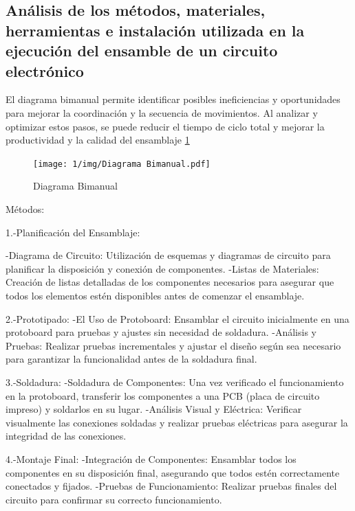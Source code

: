     \subsection{Análisis de los métodos, materiales, herramientas e instalación utilizada en la ejecución del ensamble de un circuito electrónico}
    
    El diagrama bimanual permite identificar posibles ineficiencias y oportunidades para mejorar la coordinación y la secuencia de movimientos. Al analizar y optimizar estos pasos, se puede reducir el tiempo de ciclo total y mejorar la productividad y la calidad del ensamblaje \ref{fig:Diagrama Bimanual}
     
    \begin{figure}[H]
        \centering
        \texttt{[image: 1/img/Diagrama Bimanual.pdf]}
        \caption{Diagrama Bimanual}
        \label{fig:Diagrama Bimanual}
    \end{figure}
    
    
    
    Métodos:
    
    1.-Planificación del Ensamblaje:
    
    -Diagrama de Circuito: Utilización de esquemas y diagramas de circuito para planificar la disposición y conexión de componentes.
    -Listas de Materiales: Creación de listas detalladas de los componentes necesarios para asegurar que todos los elementos estén disponibles antes de comenzar el ensamblaje.
    
    2.-Prototipado:
    -El Uso de Protoboard: Ensamblar el circuito inicialmente en una protoboard para pruebas y ajustes sin necesidad de soldadura.
    -Análisis y Pruebas: Realizar pruebas incrementales y ajustar el diseño según sea necesario para garantizar la funcionalidad antes de la soldadura final.
    
    3.-Soldadura:
    -Soldadura de Componentes: Una vez verificado el funcionamiento en la protoboard, transferir los componentes a una PCB (placa de circuito impreso) y soldarlos en su lugar.
    -Análisis Visual y Eléctrica: Verificar visualmente las conexiones soldadas y realizar pruebas eléctricas para asegurar la integridad de las conexiones.
    
    4.-Montaje Final:
    -Integración de Componentes: Ensamblar todos los componentes en su disposición final, asegurando que todos estén correctamente conectados y fijados.
    -Pruebas de Funcionamiento: Realizar pruebas finales del circuito  para confirmar su correcto funcionamiento.
    
